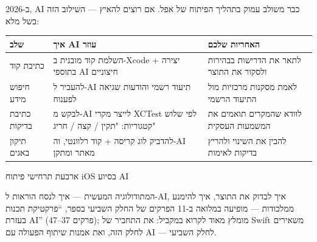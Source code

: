 
ב-2026, AI כבר משולב עמוק בתהליך הפיתוח של אפל. אם רוצים להאיץ — השילוב הזה בשל מלא:

\begin{center}
\begin{tabularx}{\linewidth}{|X|X|X|}
\hline
\textbf{שלב} & \textbf{איך AI עוזר} & \textbf{האחריות שלכם} \tabularnewline
\hline
כתיבת קוד & השלמת קוד מובנית ב-Xcode + יצירה בתוספי AI חיצוניים & לתאר את הדרישות בבהירות ולסקור את התוצר \tabularnewline
חיפוש מידע & להעביר ל-AI תיעוד רשמי והודעות שגיאה לפענוח & לאמת מסקנות מרכזיות מול התיעוד הרשמי \tabularnewline
כתיבת בדיקות & לבקש מ-AI לייצר מקרי XCTest לפי שלוש קטגוריות: "תקין / קצה / חריג" & לוודא שהמקרים תואמים את המשמעות העסקית \tabularnewline
תיקון באגים & להדביק לוג קריסה + קוד רלוונטי, וה-AI מאתר ומתקן & להבין את השינוי ולהריץ בדיקות לאימות \tabularnewline
\hline
\end{tabularx}
\end{center}

\begin{center}\small\color{gray}ארבעת תרחישי פיתוח iOS בסיוע AI\end{center}

המתודולוגיה המעשית — איך לנסח הוראות ל-AI, איך לבדוק את התוצר, איך להימנע ממלכודות — מופיעה במלואה ב-11 הפרקים של החלק השביעי בספר, “פרקטיקת תכנות בעזרת AI” (פרקים 37–47); מומלץ מאוד לקרוא במקביל: את התחביר של Swift משאירים לחלק הזה, ואת אמנות שיתוף הפעולה עם AI — לחלק השביעי.

